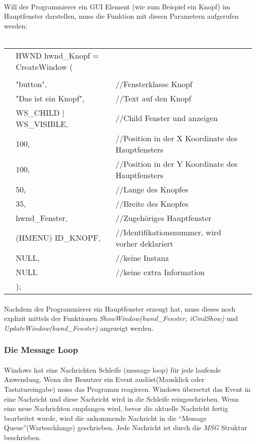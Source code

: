 \paragraph{}
Will der Programmierer ein GUI Element (wie zum Beispiel ein Knopf) im Hauptfenster darstellen, muss die Funktion mit diesen Parametern aufgerufen werden:
\\
\\
\begin{tabular}{llll}
& HWND hwnd\_Knopf = CreateWindow (\\
\\
& "button",					& //Fensterklasse Knopf\\
& "Das ist ein Knopf",		& //Text auf den Knopf\\
& WS\_CHILD | WS\_VISIBLE,	& //Child Fenster und anzeigen\\
& 100,						& //Position in der X Koordinate des Hauptfensters\\
& 100,						& //Position in der Y Koordinate des Hauptfensters\\
& 50,						& //Lange des Knopfes\\
& 35,						& //Breite des Knopfes\\
& hwnd\_Fenster,				& //Zugehöriges Hauptfenster\\
& (HMENU) ID\_KNOPF,			& //Identifikationsnummer, wird vorher deklariert\\
& NULL,						& //keine Instanz\\
& NULL						& //keine extra Information\\
& );
\end{tabular}

\paragraph{}	
					
Nachdem der Programmierer ein Hauptfenster erzeugt hat, muss dieses noch explizit mittels der Funktionen \textit{ShowWindow(hwnd\_Fenster, iCmdShow)} und \textit{UpdateWindow(hwnd\_Fenster)}	angezeigt werden.

\subsubsection{Die Message Loop}
\paragraph{}
Windows hat eine Nachrichten Schleife (message loop) für jede laufende Anwendung. Wenn der Benutzer ein Event auslöst(Mausklick oder Tastatureingabe) muss das Programm reagieren. Windows übersetzt das Event in eine Nachricht und diese Nachricht wird in die Schleife reingeschrieben. Wenn eine neue Nachrichten empfangen wird, bevor die aktuelle Nachricht fertig bearbeitet wurde, wird die ankommende Nachricht in die "`Message Queue"'(Warteschlange) geschrieben. Jede Nachricht ist durch die \textit{MSG} Struktur beschrieben.

